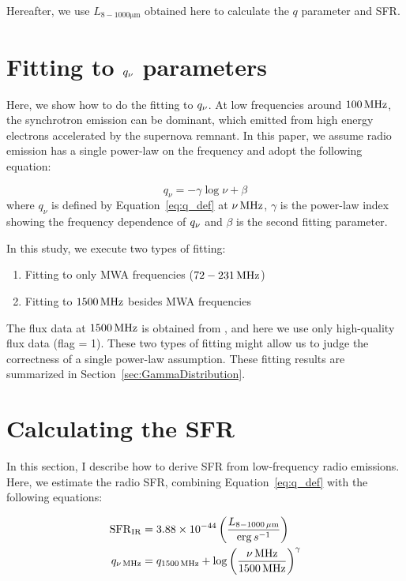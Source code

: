 Hereafter, we use $L_{8-1000\mathrm{\mu m}}$ obtained here to calculate the $q$ parameter and SFR\@.



\section{Fitting to $q_{\nu}$ parameters}\label{sec:fittingtoq}
Here, we show how to do the fitting to $q_{\nu}$.
At low frequencies around $100\,\mathrm{MHz}$, the synchrotron emission can be dominant, which emitted from high energy electrons accelerated by the supernova remnant.
In this paper, we assume radio emission has a single power-law on the frequency and adopt the following equation:

\begin{equation}\label{eq:q_fitting}
    q_{\nu} = -\gamma\log{\nu} + \beta
\end{equation}
where $q_{\nu}$ is defined by Equation~\ref{eq:q_def} at $\nu\,\mathrm{MHz}$, $\gamma$ is the power-law index showing the frequency dependence of $q_{\nu}$ and $\beta$ is the second fitting parameter.

In this study, we execute two types of fitting:

\begin{enumerate}
    \item Fitting to only MWA frequencies ($72-231\,\mathrm{MHz}$)
    \item Fitting to $1500\,\mathrm{MHz}$ besides MWA frequencies
\end{enumerate}

The flux data at $1500\,\mathrm{MHz}$ is obtained from \citet{Boselli2015}, and here we use only high-quality flux data (flag = 1).
These two types of fitting might allow us to judge the correctness of a single power-law assumption.
These fitting results are summarized in Section~\ref{sec:GammaDistribution}.



\section{Calculating the SFR}\label{sec:calculatingsfr}
In this section, I describe how to derive SFR from low-frequency radio emissions.\\
Here, we estimate the radio SFR, combining Equation~\ref{eq:q_def} with the following equations:

\begin{align}
    \mathrm{SFR}_{\mathrm{IR}} &= 3.88 \times 10^{-44}\left(\frac{L_{\mathrm{8-1000\,\mu m}}}{\mathrm{erg}\,s^{-1}}\right)\label{eq:sfrir}\\
    q_{\nu\,\mathrm{MHz}} &= q_{\mathrm{1500\,\mathrm{MHz}}} + \log{\left(\frac{\nu\,\mathrm{MHz}}{1500\,\mathrm{MHz}}\right)}^{\gamma}\label{eq:q_nuto1500}
\end{align}

